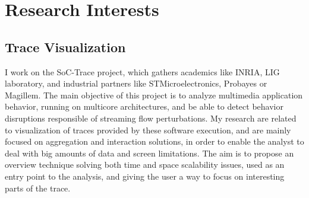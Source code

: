 \section{Research Interests}

\subsection{Trace Visualization}

%
{I work on the SoC-Trace project, which gathers academics like INRIA, LIG 
laboratory, and industrial partners like STMicroelectronics, Probayes or 
Magillem. The main objective of this project is to analyze multimedia 
application behavior, running on multicore architectures, and be able to detect 
behavior disruptions responsible of streaming flow perturbations. My research 
are related to visualization of traces provided by these software execution, and 
are mainly focused on aggregation and interaction solutions, in order to enable 
the analyst to deal with big amounts of data and screen limitations. The aim is 
to propose an overview technique solving both time and space scalability issues, 
used as an entry point to the analysis, and giving the user a way to focus on 
interesting parts of the trace.}